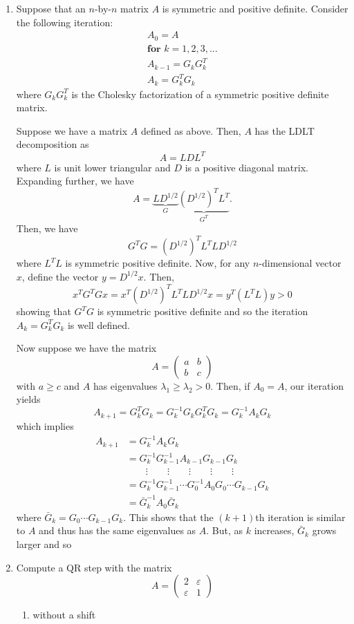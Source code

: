 \documentclass[a4paper,12pt]{article}
\newcommand{\eps}{\varepsilon}
\newcommand{\pmat}[1]{\begin{pmatrix} #1 \end{pmatrix}}
\begin{document}
\begin{enumerate}[label = (\arabic*)]
	\item Suppose that an $ n $-by-$ n $ matrix $ A $ is symmetric and positive definite. Consider the following iteration:
	\begin{gather*}
		A_0 = A \\
		\textbf{for } k = 1,2,3,\ldots \\
		A_{k - 1} = G_k G_k^T\\
		A_k = G_k^T G_k
	\end{gather*}
	where $ G_k G_k^T $ is the Cholesky factorization of a symmetric positive definite matrix.
	
	Suppose we have a matrix $ A $ defined as above. Then, $ A $ has the LDLT decomposition as
	\[
		A = LDL^T
	\]
	where $ L $ is unit lower triangular and $ D $ is a positive diagonal matrix. Expanding further, we have
	\[
		A = \underbrace{L D^{1/2}}_G \underbrace{(D^{1/2})^T L^T}_{G^T}.
	\]
	Then, we have
	\[
		G^T G = (D^{1/2})^T L^T L D^{1/2}
	\]
	where $ L^T L $ is symmetric positive definite. Now, for any $ n $-dimensional vector $ x $, define the vector $ y = D^{1/2} x $. Then,
	\[
		x^T G^T G x = x^T (D^{1/2})^T L^T L D^{1/2} x = y^T (L^T L) y > 0
	\]
	showing that $ G^T G $ is symmetric positive definite and so the iteration $ A_k = G^T_k G_k $ is well defined.
	
	Now suppose we have the matrix
	\[
		A = \pmat{a & b \\ b & c}
	\]
	with $ a \geq c $ and $ A $ has eigenvalues $ \lambda_1 \geq \lambda_2 > 0 $. Then, if $ A_0 = A $, our iteration yields
	\[
		A_{k + 1} = G_k^T G_k = G_k^{-1} G_k G_k^T G_k = G_k^{-1} A_k G_k
	\]
	which implies
	\begin{align*}
		A_{k + 1} &= G_k^{-1} A_k G_k \\
		&= G_{k}^{-1} G_{k - 1}^{-1} A_{k - 1} G_{k - 1} G_k \\
		& \qquad \vdots \qquad \vdots \qquad \vdots \qquad \vdots \qquad \vdots \\
		&= G_{k}^{-1} G_{k - 1}^{-1} \cdots G_0^{-1} A_0 G_0 \cdots G_{k - 1} G_k \\
		&= \bar{G}_k^{-1} A_0 \bar{G}_k
	\end{align*}
	where $ \bar{G}_k = G_0 \cdots G_{k - 1} G_k $. This shows that the $ (k + 1) $th iteration is similar to $ A $ and thus has the same eigenvalues as $ A $. But, as $ k $ increases, $ \bar{G}_k $ grows larger and so 
	
	\newpage
	\item Compute a QR step with the matrix
	\[
		A = \pmat{2 & \eps \\ \eps & 1}
	\]
	\begin{enumerate}[label = (\alph*)]
		\item without a shift
		

\end{enumerate}
\end{enumerate}
\end{document}
